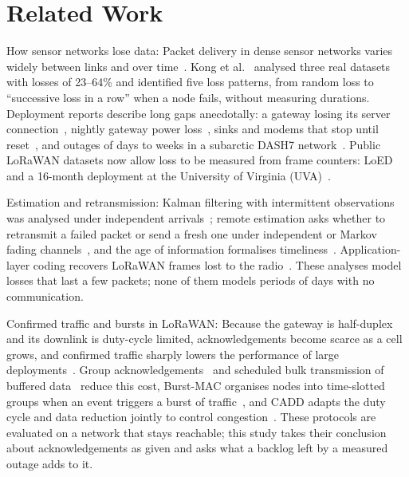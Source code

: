 \section{Related Work}
\label{sec:related}

How sensor networks lose data: Packet delivery in dense sensor networks varies widely between links and over time~\cite{zhao2003understanding}. Kong et al.~\cite{kong2014dataloss} analysed three real datasets with losses of 23--64\% and identified five loss patterns, from random loss to ``successive loss in a row'' when a node fails, without measuring durations. Deployment reports describe long gaps anecdotally: a gateway losing its server connection~\cite{ledinh2007design}, nightly gateway power loss~\cite{langendoen2006murphy}, sinks and modems that stop until reset~\cite{ingelrest2010sensorscope,brzozowski2018lessons}, and outages of days to weeks in a subarctic DASH7 network~\cite{puluckul2025subarctic}. Public LoRaWAN datasets now allow loss to be measured from frame counters: LoED~\cite{bhatia2020loed} and a 16-month deployment at the University of Virginia (UVA)~\cite{nikseresht2025uva}.

Estimation and retransmission: Kalman filtering with intermittent observations was analysed under independent arrivals~\cite{sinopoli2004kalman}; remote estimation asks whether to retransmit a failed packet or send a fresh one under independent or Markov fading channels~\cite{huang2019retransmit,huang2020harq}, and the age of information formalises timeliness~\cite{yates2021aoi,sun2026overlapping}. Application-layer coding recovers LoRaWAN frames lost to the radio~\cite{marcelis2017dare}. These analyses model losses that last a few packets; none of them models periods of days with no communication.

Confirmed traffic and bursts in LoRaWAN: Because the gateway is half-duplex and its downlink is duty-cycle limited, acknowledgements become scarce as a cell grows, and confirmed traffic sharply lowers the performance of large deployments~\cite{capuzzo2018confirmed,hoang2026unified}. Group acknowledgements~\cite{lee2021dglora} and scheduled bulk transmission of buffered data~\cite{abdelfadeel2020free} reduce this cost, Burst-MAC organises nodes into time-slotted groups when an event triggers a burst of traffic~\cite{jain2024burstmac}, and CADD adapts the duty cycle and data reduction jointly to control congestion~\cite{acostagarcia2026cadd}. These protocols are evaluated on a network that stays reachable; this study takes their conclusion about acknowledgements as given and asks what a backlog left by a measured outage adds to it.

